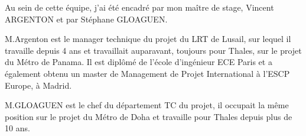 Au sein de cette équipe, j'ai été encadré par mon maître de stage, Vincent ARGENTON et par Stéphane GLOAGUEN.

M.Argenton est le manager technique du projet du \gls{LRT} de Lusail, sur lequel il travaille depuis 4 ans et travaillait auparavant, toujours pour Thales, sur le projet du Métro de Panama. Il est diplômé de l'école d'ingénieur ECE Paris et a également obtenu un master de Management de Projet International à l'ESCP Europe, à Madrid.

M.GLOAGUEN est le chef du département  \gls{TC} du projet, il occupait la même position sur le projet du Métro de Doha et travaille pour Thales depuis plus de 10 ans.
